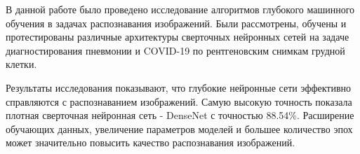 В данной работе было проведено исследование алгоритмов глубокого машинного обучения в задачах распознавания изображений. Были рассмотрены, обучены и протестированы различные архитектуры сверточных нейронных сетей на задаче диагностирования пневмонии и COVID-19 по рентгеновским снимкам грудной клетки. 

Результаты исследования показывают, что глубокие нейронные сети эффективно справляются с распознаванием изображений. Самую высокую точность показала плотная сверточная нейронная сеть - DenseNet с точностью 88.54\%.
Расширение обучающих данных, увеличение параметров моделей и большее количество эпох может значительно повысить качество распознавания изображений.


\clearpage